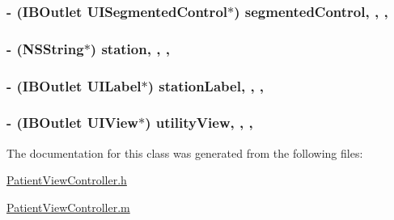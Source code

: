 \subsubsection[{segmented\+Control}]{\setlength{\rightskip}{0pt plus 5cm}-\/ (I\+B\+Outlet U\+I\+Segmented\+Control$\ast$) segmented\+Control\hspace{0.3cm}{\ttfamily [read]}, {\ttfamily [write]}, {\ttfamily [nonatomic]}, {\ttfamily [weak]}}\label{interface_patient_view_controller_aed02d7fb5b20f35baf6d768e6d74ca2b}
\hypertarget{interface_patient_view_controller_a8f8b7d70361185915526eef8d0ae605b}{}
\subsubsection[{station}]{\setlength{\rightskip}{0pt plus 5cm}-\/ (N\+S\+String$\ast$) station\hspace{0.3cm}{\ttfamily [read]}, {\ttfamily [write]}, {\ttfamily [nonatomic]}, {\ttfamily [strong]}}\label{interface_patient_view_controller_a8f8b7d70361185915526eef8d0ae605b}
\hypertarget{interface_patient_view_controller_a22bfc7a8180b3ea86643917b4c772333}{}
\subsubsection[{station\+Label}]{\setlength{\rightskip}{0pt plus 5cm}-\/ (I\+B\+Outlet U\+I\+Label$\ast$) station\+Label\hspace{0.3cm}{\ttfamily [read]}, {\ttfamily [write]}, {\ttfamily [nonatomic]}, {\ttfamily [weak]}}\label{interface_patient_view_controller_a22bfc7a8180b3ea86643917b4c772333}
\hypertarget{interface_patient_view_controller_aef3bd4cf26a022b5b5cecb2976e72920}{}
\subsubsection[{utility\+View}]{\setlength{\rightskip}{0pt plus 5cm}-\/ (I\+B\+Outlet U\+I\+View$\ast$) utility\+View\hspace{0.3cm}{\ttfamily [read]}, {\ttfamily [write]}, {\ttfamily [nonatomic]}, {\ttfamily [weak]}}\label{interface_patient_view_controller_aef3bd4cf26a022b5b5cecb2976e72920}


The documentation for this class was generated from the following files\+:\begin{DoxyCompactItemize}
\item 
\hyperlink{_patient_view_controller_8h}{Patient\+View\+Controller.\+h}\item 
\hyperlink{_patient_view_controller_8m}{Patient\+View\+Controller.\+m}\end{DoxyCompactItemize}
